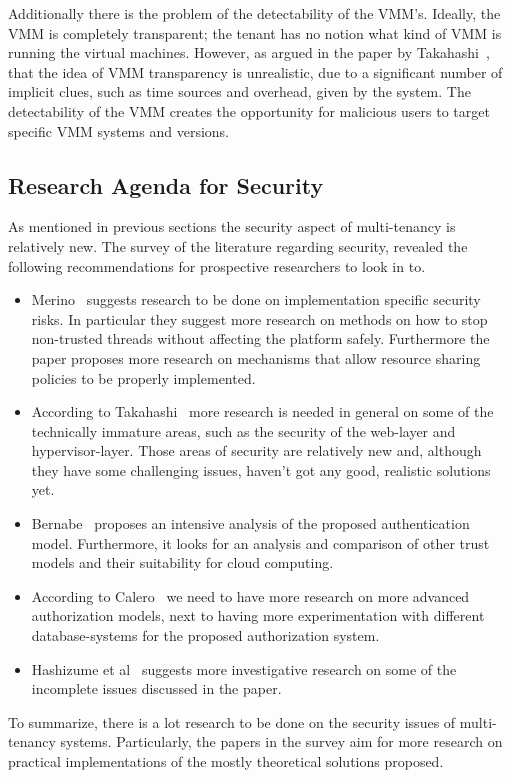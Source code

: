 Additionally there is the problem of the detectability of the \ac{VMM}’s. Ideally, the \ac{VMM} is completely transparent; the tenant has no notion what kind of \ac{VMM} is running the virtual machines. 
However, as argued in the paper by Takahashi~\cite{Takahashi2012Security}, that the idea of \ac{VMM} transparency is unrealistic, due to a significant number of implicit clues, such as time sources and overhead, given by the system. 
The detectability of the \ac{VMM} creates the opportunity for malicious users to target specific \ac{VMM} systems and versions.

\subsection{Research Agenda for Security}
As mentioned in previous sections the security aspect of multi-tenancy is relatively new.
The survey of the literature regarding security, revealed the following recommendations for prospective researchers to look in to. 
\begin{itemize}
    \item Merino~\cite{Merino2011Security} suggests research to be done on implementation specific security risks. In particular they suggest more research on methods on how to stop non-trusted threads without affecting the platform safely. Furthermore the paper proposes more research on mechanisms that allow resource sharing policies to be properly implemented.
    \item According to Takahashi~\cite{Takahashi2012Security} more research is needed in general on some of the technically immature areas, such as the security of the web-layer and hypervisor-layer.
Those areas of security are relatively new and, although they have some challenging issues, haven't got any good, realistic solutions yet.
    \item Bernabe~\cite{Bernabe2012Auth} proposes an intensive analysis of the proposed authentication model.
Furthermore, it looks for an analysis and comparison of other trust models and their suitability for cloud computing.
    \item According to Calero~\cite{Calero2010Auth} we need to have more research on more advanced authorization models, next to having more experimentation with different database-systems for the proposed authorization system.
    \item Hashizume et al~\cite{Hashizume2013Security} suggests more investigative research on some of the incomplete issues discussed in the paper.
\end{itemize}
To summarize, there is a lot research to be done on the security issues of multi-tenancy systems.
Particularly, the papers in the survey aim for more research on practical implementations of the mostly theoretical solutions proposed.
